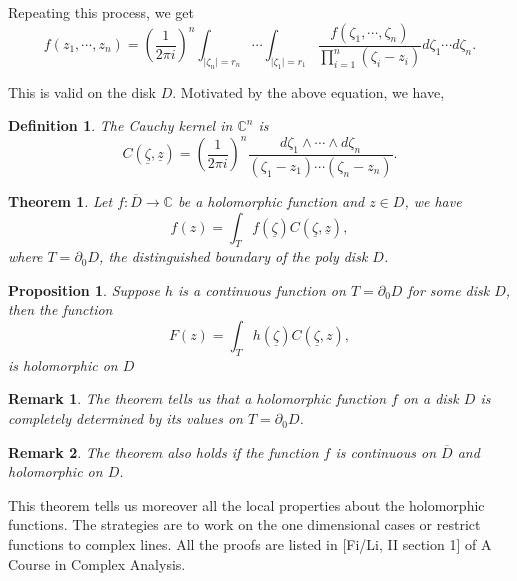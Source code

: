 \documentclass{article}
\newtheorem{theorem}{Theorem} [section]
\newtheorem{proposition}{Proposition}[section]
\newtheorem{definition}{Definition}[section]
\newtheorem{remark}{Remark}[section]
\newcommand{\C}[0]{\mathbb{C}}
\begin{document}
Repeating this process, we get
\begin{equation*}
f(z_1,\cdots,z_n) = \left({\frac 1 {2\pi i}}\right)^n\int_{\vert \zeta_n\vert = r_n}\cdots\int_{\vert \zeta_1\vert = r_1}{\frac {f(\zeta_1,\cdots,\zeta_n)} {\prod_{i=1}^n(\zeta_i-z_i)}}d\zeta_1\cdots d\zeta_n.
\end{equation*}

This is valid on the disk $D$. Motivated by the above equation, we have,

\begin{definition}
The Cauchy kernel in $\C^n$ is 
\begin{equation*}
C(\underline{\zeta},\underline{z}) = \left({\frac 1 {2\pi i}}\right)^n{\frac {d\zeta_1\wedge\cdots\wedge d\zeta_n} {(\zeta_1-z_1)\cdots(\zeta_n-z_n)}}.
\end{equation*}
\end{definition}

\begin{theorem}
Let $f:\overline{D}\to\C$ be a holomorphic function and $z\in D$, we have
\begin{equation*}
f(z) = \int_T f(\underline{\zeta})C(\underline{\zeta},\underline{z}),
\end{equation*}
where $T=\partial_0D$, the distinguished boundary of the poly disk $D$. 
\label{cauchy_integral_several_variable}
\end{theorem}

\begin{proposition}
Suppose $h$ is a continuous function on $T=\partial_0D$ for some disk $D$, then the function
\begin{equation*}
F(z) = \int_Th(\underline{\zeta})C(\underline{\zeta},z),
\end{equation*}
is holomorphic on $D$
\end{proposition}

\begin{remark}
The theorem tells us that a holomorphic function $f$ on a disk $D$ is completely determined by its values on $T=\partial_0D$.
\end{remark}

\begin{remark}
The theorem also holds if the function $f$ is continuous on $\overline{D}$ and holomorphic on $D$.
\end{remark}

This theorem tells us moreover all the local properties about the holomorphic functions. The strategies are to work on the one dimensional cases or restrict functions to complex lines. All the proofs are listed in [Fi/Li, II section 1] of A Course in Complex Analysis.
\end{document}
